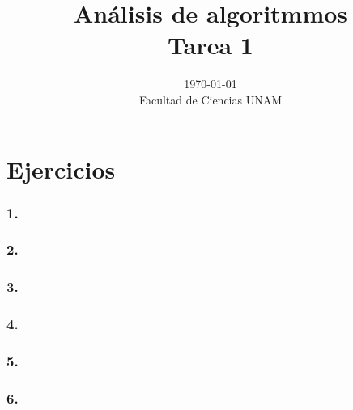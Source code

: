 \documentclass[12pt]{article}
\title{Análisis de algoritmmos \\ Tarea 1}
\author{}
\date{\today \\ Facultad de Ciencias UNAM}
\begin{document}
\maketitle

\section*{Ejercicios}
\subsubsection*{1.}
\subsubsection*{2.}
\subsubsection*{3.}
\subsubsection*{4.}
\subsubsection*{5.}
\subsubsection*{6.}
\end{document}
